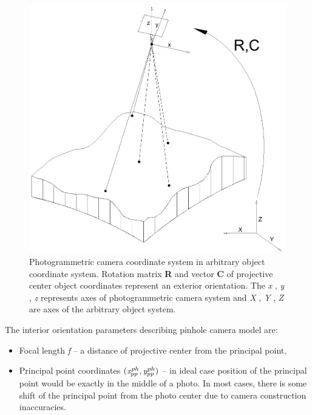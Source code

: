 \documentclass[a4paper,12pt]{article}
\newcommand{\ematr}[1]{%
{\bf #1}%
}
\newcommand{\escal}[1]{%
{\it #1}%
}
\begin{document}
\begin{figure}[h]
    \centering
    \includegraphics[scale=0.3]{figures/photogrammetric_model.png}
    \caption{Photogrammetric camera coordinate system in arbitrary object coordinate system.
    Rotation matrix \ematr{R} and vector \ematr{C} of projective center object coordinates represent 
    an exterior orientation. The \escal{x}, \escal{y}, \escal{z} represents axes of photogrammetric camera system and 
     \escal{X}, \escal{Y}, \escal{Z} are axes of the arbitrary object system.}
    \label{fig:ph_model}
\end{figure}

\noindent The interior orientation parameters describing pinhole camera model are:
\begin{itemize}
  \item Focal length \escal{f} -- a distance of projective center from the principal point,
  \item Principal point coordinates $(\escal{x}^{ph}_{pp}, \escal{y}^{ph}_{pp})$ -- in ideal case position of the principal point would be exactly in the middle 
	of a photo.  In most cases, there is some shift of the principal point from the photo center due to
	camera construction inaccuracies.
\end{itemize}
\end{document}
